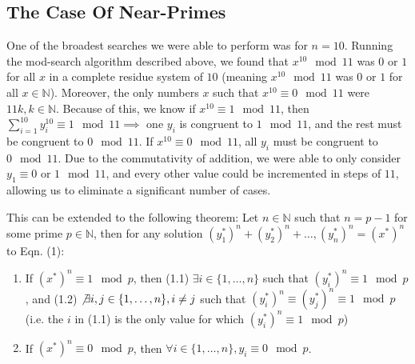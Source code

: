 \documentclass{article}
\begin{document}
\begin{flushleft}
\section{The Case Of Near-Primes}

One of the broadest searches we were able to perform was for $n = 10$. Running the mod-search algorithm described above, we found that $x^{10} \mod 11$ was $0$ or $1$ for all $x$ in a complete residue system of $10$ (meaning $x^{10} \mod 11$ was $0$ or $1$ for all $x \in \mathbb{N}$). Moreover, the only numbers $x$ such that $x^{10} \equiv 0 \mod 11$ were $11k, k \in \mathbb{N}$. Because of this, we know if $x^{10} \equiv 1 \mod 11$, then $\sum^{10}_{i=1}y_i^{10} \equiv 1 \mod 11 \implies$ one $y_i$ is congruent to $1 \mod 11$, and the rest must be congruent to $0 \mod 11$. If $x^{10} \equiv 0 \mod 11$, all $y_i$ must be congruent to $0 \mod 11$. Due to the commutativity of addition, we were able to only consider $y_1 \equiv 0$ or $1 \mod 11$, and every other value could be incremented in steps of $11$, allowing us to eliminate a significant number of cases.

\vspace{.1in}

This can be extended to the following theorem: Let $n \in \mathbb{N}$ such that $n = p - 1$ for some prime $p \in \mathbb{N}$, then for any solution $(y_1^*)^n + (y_2^*)^n + \ldots, (y_n^*)^n = (x^*)^n$ to Eqn. (1): 
    \begin{enumerate}
        \item If $(x^*)^n \equiv 1 \mod p$, then (1.1) $\exists i \in \{1, \ldots, n\}$ such that $(y^*_i)^n \equiv 1 \mod p$, and (1.2) $\not\exists i, j \in \{1, \ldots, n\}, i \neq j$ such that $(y^*_i)^n \equiv (y^*_j)^n \equiv 1 \mod p$ (i.e. the $i$ in (1.1) is the only value for which $(y^*_i)^n \equiv 1 \mod p$)
        \item If $(x^*)^n \equiv 0 \mod p$, then $\forall i \in \{1, \ldots, n\}, y_i \equiv 0 \mod p$.
    \end{enumerate}


\end{flushleft}
\end{document}
